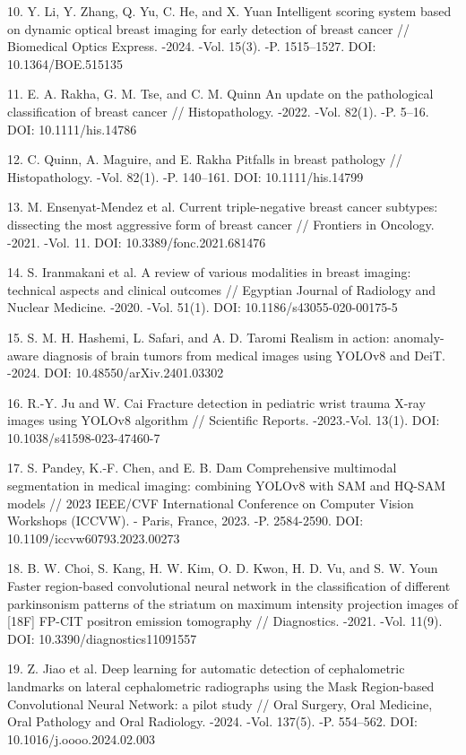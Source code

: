 10. Y. Li, Y. Zhang, Q. Yu, C. He, and X. Yuan Intelligent scoring
system based on dynamic optical breast imaging for early detection of
breast cancer // Biomedical Optics Express. -2024. -Vol. 15(3). -P.
1515--1527. DOI: 10.1364/BOE.515135

11. E. A. Rakha, G. M. Tse, and C. M. Quinn An update on the
pathological classification of breast cancer // Histopathology. -2022.
-Vol. 82(1). -P. 5--16. DOI: 10.1111/his.14786

12. C. Quinn, A. Maguire, and E. Rakha Pitfalls in breast pathology //
Histopathology. -Vol. 82(1). -P. 140--161. DOI: 10.1111/his.14799

13. M. Ensenyat-Mendez et al. Current triple-negative breast cancer
subtypes: dissecting the most aggressive form of breast cancer //
Frontiers in Oncology. -2021. -Vol. 11. DOI: 10.3389/fonc.2021.681476

14. S. Iranmakani et al. A review of various modalities in breast
imaging: technical aspects and clinical outcomes // Egyptian Journal of
Radiology and Nuclear Medicine. -2020. -Vol. 51(1). DOI:
10.1186/s43055-020-00175-5

15. S. M. H. Hashemi, L. Safari, and A. D. Taromi Realism in action:
anomaly-aware diagnosis of brain tumors from medical images using YOLOv8
and DeiT. -2024. DOI: 10.48550/arXiv.2401.03302

16. R.-Y. Ju and W. Cai Fracture detection in pediatric wrist trauma
X-ray images using YOLOv8 algorithm // Scientific Reports. -2023.-Vol.
13(1). DOI: 10.1038/s41598-023-47460-7

17. S. Pandey, K.-F. Chen, and E. B. Dam Comprehensive multimodal
segmentation in medical imaging: combining YOLOv8 with SAM and HQ-SAM
models // 2023 IEEE/CVF International Conference on Computer Vision
Workshops (ICCVW). - Paris, France, 2023. -P. 2584-2590. DOI:
10.1109/iccvw60793.2023.00273

18. B. W. Choi, S. Kang, H. W. Kim, O. D. Kwon, H. D. Vu, and S. W. Youn
Faster region-based convolutional neural network in the classification
of different parkinsonism patterns of the striatum on maximum intensity
projection images of {[}18F{]} FP-CIT positron emission tomography //
Diagnostics. -2021. -Vol. 11(9). DOI: 10.3390/diagnostics11091557

19. Z. Jiao et al. Deep learning for automatic detection of
cephalometric landmarks on lateral cephalometric radiographs using the
Mask Region-based Convolutional Neural Network: a pilot study // Oral
Surgery, Oral Medicine, Oral Pathology and Oral Radiology. -2024. -Vol.
137(5). -P. 554--562. DOI: 10.1016/j.oooo.2024.02.003

